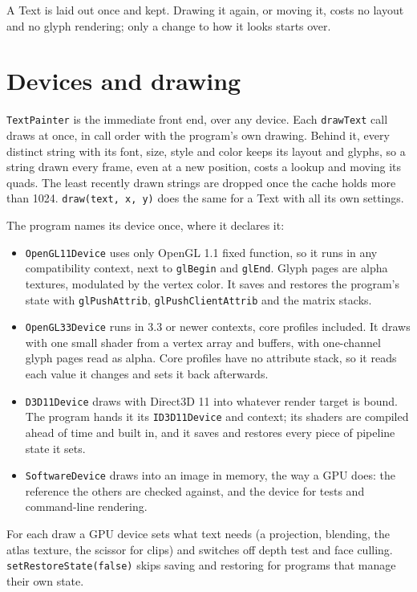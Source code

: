 \documentclass[11pt]{article}
\begin{document}
A Text is laid out once and kept. Drawing it again, or moving it, costs no layout and no glyph rendering; only a change to how it looks starts over.

\section{Devices and drawing}

\texttt{TextPainter} is the immediate front end, over any device. Each \texttt{drawText} call draws at once, in call order with the program's own drawing. Behind it, every distinct string with its font, size, style and color keeps its layout and glyphs, so a string drawn every frame, even at a new position, costs a lookup and moving its quads. The least recently drawn strings are dropped once the cache holds more than 1024. \texttt{draw(text, x, y)} does the same for a Text with all its own settings.

The program names its device once, where it declares it:
\begin{itemize}
	\item \texttt{OpenGL11Device} uses only OpenGL 1.1 fixed function, so it runs in any compatibility context, next to \texttt{glBegin} and \texttt{glEnd}. Glyph pages are alpha textures, modulated by the vertex color. It saves and restores the program's state with \texttt{glPushAttrib}, \texttt{glPushClientAttrib} and the matrix stacks.
	\item \texttt{OpenGL33Device} runs in 3.3 or newer contexts, core profiles included. It draws with one small shader from a vertex array and buffers, with one-channel glyph pages read as alpha. Core profiles have no attribute stack, so it reads each value it changes and sets it back afterwards.
	\item \texttt{D3D11Device} draws with Direct3D 11 into whatever render target is bound. The program hands it its \texttt{ID3D11Device} and context; its shaders are compiled ahead of time and built in, and it saves and restores every piece of pipeline state it sets.
	\item \texttt{SoftwareDevice} draws into an image in memory, the way a GPU does: the reference the others are checked against, and the device for tests and command-line rendering.
\end{itemize}
For each draw a GPU device sets what text needs (a projection, blending, the atlas texture, the scissor for clips) and switches off depth test and face culling. \texttt{setRestoreState(false)} skips saving and restoring for programs that manage their own state.
\end{document}
